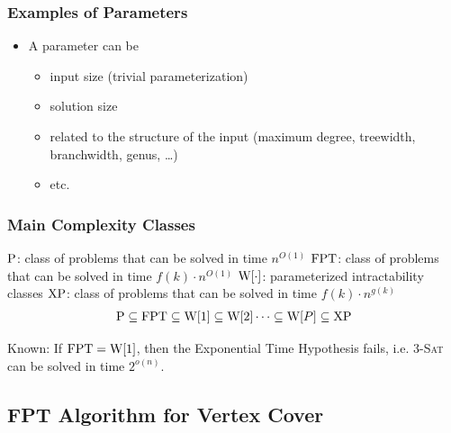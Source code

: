 \begin{frame}
	\frametitle{Examples of Parameters}


	\slides{\bigskip}
	\begin{itemize}
		\item A parameter can be
		      \begin{itemize}
			      \item input size (trivial parameterization)
			      \item solution size
			      \item related to the structure of the input (maximum degree, treewidth, branchwidth, genus, \ldots)
			      \item etc.
		      \end{itemize}
	\end{itemize}

\end{frame}


\begin{frame}
	\frametitle{Main Complexity Classes}

	\noindent
	$\P$: class of problems that can be solved in time $n^{O(1)}$\newline
	$\FPT$: class of problems that can be solved in time $f(k) \cdot n^{O(1)}$\newline
	$\W[\cdot]$: parameterized intractability classes\newline
	$\XP$: class of problems that can be solved in time $f(k) \cdot n^{g(k)}$ %
	\slides{\bigskip}
	\begin{align*}
		\P \subseteq \FPT \subseteq \W[1] \subseteq \W[2] \dots \subseteq \W[P] \subseteq \XP
	\end{align*}
	\slides{\bigskip}

	\noindent
	Known: If $\FPT = \W[1]$, then the Exponential Time Hypothesis fails,
	i.e. 3-\textsc{Sat} can be solved in time $2^{o(n)}$.

\end{frame}

\subsection{FPT Algorithm for Vertex Cover}

